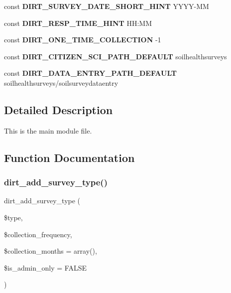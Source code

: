 \begin{DoxyCompactItemize}
const {\bfseries D\+I\+R\+T\+\_\+\+S\+U\+R\+V\+E\+Y\+\_\+\+D\+A\+T\+E\+\_\+\+S\+H\+O\+R\+T\+\_\+\+H\+I\+NT} \textquotesingle{}Y\+Y\+YY-\/MM\textquotesingle{}
\item 
\mbox{\label{dirt_8module_a804c6c31f4a8f3c0dc066fac2c8d9d32}} 
const {\bfseries D\+I\+R\+T\+\_\+\+R\+E\+S\+P\+\_\+\+T\+I\+M\+E\+\_\+\+H\+I\+NT} \textquotesingle{}H\+H\+:\+MM\textquotesingle{}
\item 
\mbox{\label{dirt_8module_a61c93e46987292c69d5f183111456c0c}} 
const {\bfseries D\+I\+R\+T\+\_\+\+O\+N\+E\+\_\+\+T\+I\+M\+E\+\_\+\+C\+O\+L\+L\+E\+C\+T\+I\+ON} -\/1
\item 
\mbox{\label{dirt_8module_aab830248424b5e4ff071417fd7256ab0}} 
const {\bfseries D\+I\+R\+T\+\_\+\+C\+I\+T\+I\+Z\+E\+N\+\_\+\+S\+C\+I\+\_\+\+P\+A\+T\+H\+\_\+\+D\+E\+F\+A\+U\+LT} \textquotesingle{}soilhealthsurveys\textquotesingle{}
\item 
\mbox{\label{dirt_8module_a38ae5e059db90edb47dbb16228e966e2}} 
const {\bfseries D\+I\+R\+T\+\_\+\+D\+A\+T\+A\+\_\+\+E\+N\+T\+R\+Y\+\_\+\+P\+A\+T\+H\+\_\+\+D\+E\+F\+A\+U\+LT} \textquotesingle{}soilhealthsurveys/soilsurveydataentry\textquotesingle{}
\end{DoxyCompactItemize}


\subsection{Detailed Description}
This is the main module file. 

\subsection{Function Documentation}
\mbox{\label{dirt_8module_a85f320016449a72071e36743131bbdbb}} 
\subsubsection{\texorpdfstring{dirt\+\_\+add\+\_\+survey\+\_\+type()}{dirt\_add\_survey\_type()}}
{\footnotesize\ttfamily dirt\+\_\+add\+\_\+survey\+\_\+type (\begin{DoxyParamCaption}\item[{}]{\$type,  }\item[{}]{\$collection\+\_\+frequency,  }\item[{}]{\$collection\+\_\+months = {\ttfamily array()},  }\item[{}]{\$is\+\_\+admin\+\_\+only = {\ttfamily FALSE} }\end{DoxyParamCaption})}

